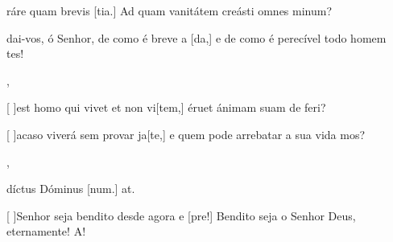 {  {\item {}ráre quam brevis [tia.] Ad quam vanitátem creásti omnes minum?~\Antiphona}%
    {\item {}dai-vos, ó Senhor, de como é breve a [da,] e de como é perecível todo homem \-tes!~\Antiphona},
  {\item {}[ ]{est} homo qui vivet et non vi[tem,] éruet ánimam suam de feri?~\Antiphona}%
    {\item {}[ ]{a}caso viverá sem provar ja[te,] e quem pode arrebatar a sua vida mos?~\Antiphona},
  {\item {}díctus Dóminus [num.] at.~\Antiphona}%
    {\item {}[ ]{Se}nhor seja bendito desde agora e [pre!] Bendito seja o Senhor Deus, eternamente! A!~\Antiphona}
}